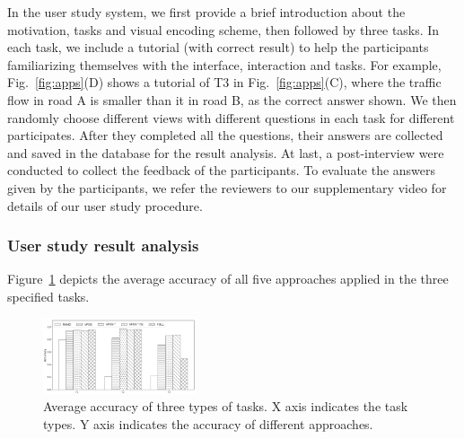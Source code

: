 In the user study system, we first provide a brief introduction about the motivation, tasks and visual encoding scheme, then followed by three tasks.
In each task, we include a tutorial (with correct result) to help the participants familiarizing themselves with the interface, interaction and tasks.
For example, Fig.~\ref{fig:apps}(D) shows a tutorial of T3 in Fig.~\ref{fig:apps}(C), where the traffic flow in road A is smaller than it in road B, as the correct answer shown.
We then randomly choose different views with different questions in each task for different participates.
After they completed all the questions, their answers are collected and saved in the database for the result analysis.
At last, a post-interview were conducted to collect the feedback of the participants.
To evaluate the answers given by the participants, we refer the reviewers to our supplementary video for details of our user study procedure.


\subsubsection{User study result analysis}\label{sec:uret}
Figure~\ref{fig:accuracy} depicts the average accuracy of all five approaches applied in the three specified tasks.


\begin{figure}[t]
	\centering
	\includegraphics[width=0.40\textwidth]{pictures/user_study/accuracy.png}
	\vspace{-4mm}
	\caption{Average accuracy of three types of tasks. X axis indicates the task types. Y axis indicates the accuracy of different approaches.}
	\label{fig:accuracy}
	\vspace{-6mm}
\end{figure}



